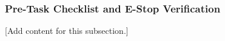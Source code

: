 
\subsubsection{Pre-Task Checklist and E-Stop Verification}
\label{subsubsec:design_12_4_pretask_checklist_estop_verification}

[Add content for this subsection.]
